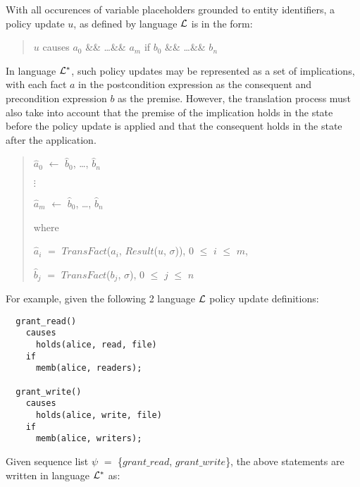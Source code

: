 \documentclass[10pt, twocolumn]{article}
\begin{document}
          With all occurences of variable placeholders grounded to entity
          identifiers, a policy update $u$, as defined by language ${\cal L}$
          is in the form:

          \begin{quote}
            $u$ causes $a_{0}$ \&\& \ldots \&\& $a_{m}$
            if $b_{0}$ \&\& \ldots \&\& $b_{n}$
          \end{quote}

          In language ${\cal L}^{*}$, such policy updates may be represented as
          a set of implications, with each fact $a$ in the postcondition
          expression as the consequent and precondition expression $b$ as the
          premise. However, the translation process must also take into account
          that the premise of the implication holds in the state before the
          policy update is applied and that the consequent holds in the state
          after the application.

          \begin{quote}
            $\hat{a}_{0}$ $\leftarrow$ $\hat{b}_{0}$, \ldots, $\hat{b}_{n}$

            $\vdots$

            $\hat{a}_{m}$ $\leftarrow$ $\hat{b}_{0}$, \ldots, $\hat{b}_{n}$

            where

            $\hat{a}_{i}$ $=$ $TransFact$($a_{i}$, $Result$($u$, $\sigma$)),
            $0$ $\leq$ $i$ $\leq$ $m$,

            $\hat{b}_{j}$ $=$ $TransFact$($b_{j}$, $\sigma$),
            $0$ $\leq$ $j$ $\leq$ $n$
          \end{quote}

          For example, given the following 2 language ${\cal L}$ policy update
          definitions:

          \begin{verbatim}
  grant_read()
    causes
      holds(alice, read, file)
    if
      memb(alice, readers);

  grant_write()
    causes
      holds(alice, write, file)
    if
      memb(alice, writers);
          \end{verbatim}

          Given sequence list $\psi$ $=$ \{$grant\_read$, $grant\_write$\},
          the above statements are written in language ${\cal L}^{*}$ as:
\end{document}
